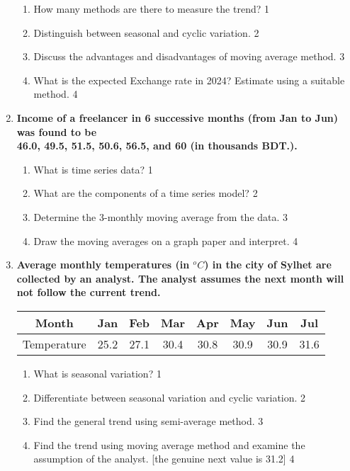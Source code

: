 \documentclass[a4paper,oneside]{book}
\begin{document}
\begin{enumerate}
  
  \begin{enumerate}
    \item
	How many methods are there to measure the trend? \hfill 1
    \item
	Distinguish between seasonal and cyclic variation. \hfill 2
    \item  
	Discuss the advantages and disadvantages of moving average method. \hfill 3
    \item
	What is the expected Exchange rate in 2024? Estimate using a suitable method. \hfill 4
  \end{enumerate}

 \item
	  \textbf{Income of a freelancer in 6 successive months (from Jan to Jun) was found to be \\ 46.0, 49.5, 51.5, 50.6, 56.5, and 60 (in thousands BDT.).}
  \begin{enumerate}
    \item
	What is time series data? \hfill 1
    \item
	What are the components of a time series model? \hfill 2
    \item  
	Determine the 3-monthly moving average from the data. \hfill 3
    \item
	Draw the moving averages on a graph paper and interpret. \hfill 4
\end{enumerate}

 \item
	  \textbf{Average monthly temperatures (in $^o C$) in the city of Sylhet are collected by an analyst. The analyst assumes the next month will not follow the current trend.} 
	  
	  \begin{table}[h]
	  \centering
\begin{tabular}{c|c|c|c|c|c|c|c}
Month & Jan & Feb & Mar & Apr & May & Jun & Jul \\ \hline
Temperature & 25.2 & 27.1 & 30.4 & 30.8 & 30.9 & 30.9 & 31.6
\end{tabular}
\end{table}
  
  \begin{enumerate}
    \item
	What is seasonal variation? \hfill 1
    \item
	Differentiate between seasonal variation and cyclic variation. \hfill 2
    \item  
	Find the general trend using semi-average method. \hfill 3
    \item
	Find the trend using moving average method and examine the assumption of the analyst. [the genuine next value is 31.2] \hfill 4
  \end{enumerate}

\end{enumerate}
\end{document}
